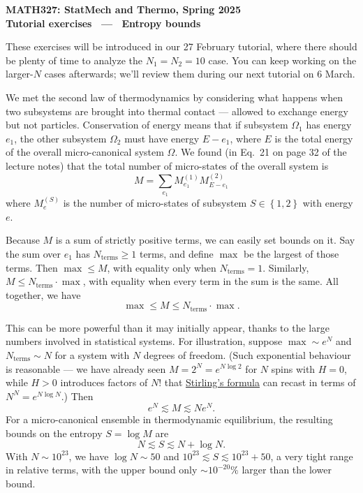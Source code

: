 \documentclass[12 pt]{article} %
\newcommand{\Om}{\ensuremath{\Omega} }
\begin{document}
\newcommand{\thisunit}{MATH327 Tutorial (Entropy)}
\newcommand{\moddate}{Last modified 26 Feb.~2025}
\begin{center}
  {\Large \textbf{MATH327: StatMech and Thermo, Spring 2025}} \\[12 pt]
  {\Large \textbf{Tutorial exercises \ --- \ Entropy bounds}} \\[24 pt]
\end{center}

These exercises will be introduced in our 27 February tutorial, where there should be plenty of time to analyze the $N_1 = N_2 = 10$ case.
You can keep working on the larger-$N$ cases afterwards; we'll review them during our next tutorial on 6 March.

We met the second law of thermodynamics by considering what happens when two subsystems are brought into thermal contact --- allowed to exchange energy but not particles.
Conservation of energy means that if subsystem $\Om_1$ has energy $e_1$, the other subsystem $\Om_2$ must have energy $E - e_1$, where $E$ is the total energy of the overall micro-canonical system $\Om$.
We found (in Eq.~21 on page 32 of the lecture notes) that the total number of micro-states of the overall system is
\begin{equation*}
  M = \sum_{e_1} M_{e_1}^{(1)} M_{E - e_1}^{(2)}
\end{equation*}
where $M_e^{(S)}$ is the number of micro-states of subsystem $S \in \left\{1, 2\right\}$ with energy $e$.

Because $M$ is a sum of strictly positive terms, we can easily set bounds on it.
Say the sum over $e_1$ has $N_{\text{terms}} \geq 1$ terms, and define $\max$ be the largest of those terms.
Then $\max \leq M$, with equality only when $N_{\text{terms}} = 1$.
Similarly, $M \leq N_{\text{terms}} \cdot \max$, with equality when every term in the sum is the same.
All together, we have
\begin{equation*}
  \max \leq M \leq N_{\text{terms}} \cdot \max.
\end{equation*}

This can be more powerful than it may initially appear, thanks to the large numbers involved in statistical systems.
For illustration, suppose $\max \sim e^N$ and $N_{\text{terms}} \sim N$ for a system with $N$ degrees of freedom.
(Such exponential behaviour is reasonable --- we have already seen $M = 2^N = e^{N\log 2}$ for $N$ spins with $H = 0$, while $H > 0$ introduces factors of $N!$ that \href{https://en.wikipedia.org/wiki/Stirling's_approximation}{Stirling's formula} can recast in terms of $N^N = e^{N\log N}$.)
Then
\begin{equation*}
  e^N \lesssim M \lesssim N e^N.
\end{equation*}
For a micro-canonical ensemble in thermodynamic equilibrium, the resulting bounds on the entropy $S = \log M$ are
\begin{equation*}
  N \lesssim S \lesssim N + \log N.
\end{equation*}
With $N \sim 10^{23}$, we have $\log N \sim 50$ and $10^{23} \lesssim S \lesssim 10^{23} + 50$, a very tight range in relative terms, with the upper bound only $\sim$$10^{-20}\%$ larger than the lower bound.
\end{document}
